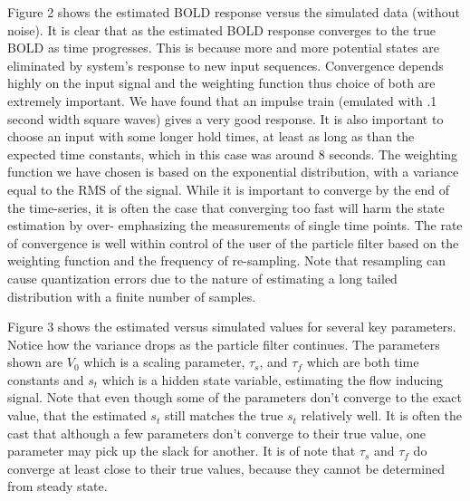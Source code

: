 \documentclass{article}
\begin{document}
Figure 2 shows the estimated BOLD response versus the simulated
data (without noise). It is clear that as the estimated BOLD
response converges to the true BOLD as time progresses. This
is because more and more potential states are eliminated by system's
response to new input sequences. Convergence depends highly on 
the input signal and the weighting function thus choice of both
are extremely important. We have found that an impulse train
(emulated with .1 second width square waves) gives a very good
response. It is also important to choose an input with
some longer hold times, at least as long as than the 
expected time constants, which in this case was around 
8 seconds. The weighting function we have chosen is based
on the exponential distribution, with a variance equal to
the RMS of the signal. While it is important to converge
by the end of the time-series, it is often the case that 
converging too fast will harm the state estimation by over-
emphasizing the measurements of single time points. The rate
of convergence is well within control of the user of the 
particle filter based on the weighting function and the frequency
of re-sampling. Note that resampling can cause quantization
errors due to the nature of estimating a long tailed 
distribution with a finite number of samples. 

Figure 3 shows the estimated versus simulated values for
several key parameters. Notice how the variance drops as
the particle filter continues. The parameters shown are
$V_0$ which is a scaling parameter, $\tau_s$, and $\tau_f$
which are both time constants and $s_t$ which is a hidden
state variable, estimating the flow inducing signal. Note that
even though some of the parameters don't converge to the exact
value, that the estimated $s_t$ still matches the true
$s_t$ relatively well. It is often the cast that although a
few parameters don't converge to their true value, one 
parameter may pick up the slack for another. It is of
note that $\tau_s$ and $\tau_f$ do converge at least close
to their true values, because they cannot be determined
from steady state. 



\end{document}
